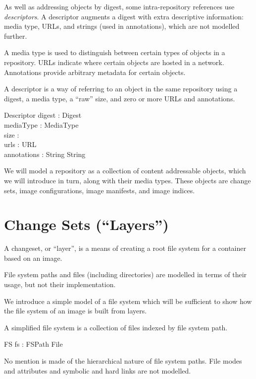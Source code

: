 \documentclass[a4paper,twoside,12pt]{article}
\begin{document}
As well as addressing objects by digest, some intra-repository references use \textit{descriptors}. A descriptor augments a digest with extra descriptive information: media type, URLs, and strings (used in annotations), which are not modelled further.
\begin{zed}
\end{zed}
A media type is used to distinguish between certain types of objects in a repository. URLs indicate where certain objects are hosted in a network. Annotations provide arbitrary metadata for certain objects.

A descriptor is a way of referring to an object in the same repository using a digest, a media type, a ``raw'' size, and zero or more URLs and annotations.
\begin{schema}{Descriptor}
  digest : Digest \\
  mediaType : MediaType \\
  size : \nat \\
  urls : \seq URL \\
  annotations : String \pfun String \\
\end{schema}

We will model a repository as a collection of content addressable objects, which we will introduce in turn, along with their media types.
These objects are change sets, image configurations, image manifests, and image indices.

\newpage
\section{Change Sets (``Layers'')}

A changeset, or ``layer'', is a means of creating a root file system for a container based on an image.

File system paths and files (including directories) are modelled in terms of their usage, but not their implementation.
\begin{zed}
\end{zed}

We introduce a simple model of a file system which will be sufficient to show how the file system of an image is built from layers.

A simplified file system is a collection of files indexed by file system path.
\begin{schema}{FS}
  fs : FSPath \pfun File \\
\end{schema}
No mention is made of the hierarchical nature of file system paths. File modes and attributes and symbolic and hard links are not modelled.
\end{document}
